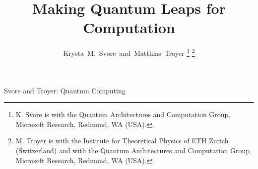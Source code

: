 \documentclass[journal]{IEEEtran}
\begin{document}
%
\title{Making Quantum Leaps for Computation}
%
%
%

\author{Krysta~M.~Svore~and~Matthias~Troyer%
\thanks{K. Svore is with the Quantum Architectures and Computation Group, Microsoft Research, Redmond, WA (USA).}%
\thanks{M. Troyer is with the Institute for Theoretical Physics of ETH Zurich (Switzerland)  and with the Quantum Architectures and Computation Group, Microsoft Research, Redmond, WA (USA).}%
}

% 
%



%
{Svore and Troyer: Quantum Computing}%
% 
\end{document}
